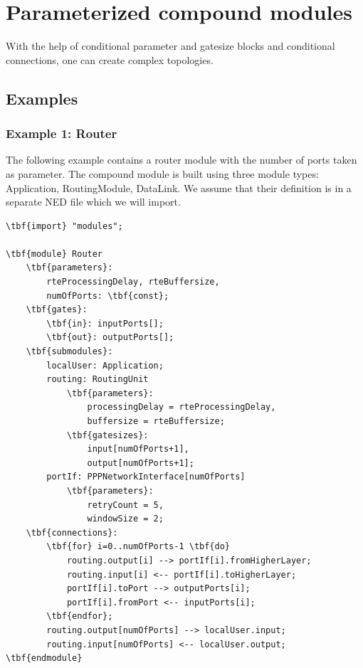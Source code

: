 \section{Parameterized compound modules}


With the help of conditional parameter and gatesize blocks and
conditional connections, one can
create complex topologies.


\subsection{Examples}

\subsubsection{Example 1: Router}

The following example contains a router module with the number of
ports taken as parameter. The compound module is built using three
module types: Application, RoutingModule, DataLink. We assume that
their definition is in a separate NED file which we will import.

\begin{Verbatim}[commandchars=\\\{\}]
\tbf{import} "modules";

\tbf{module} Router
    \tbf{parameters}:
        rteProcessingDelay, rteBuffersize,
        numOfPorts: \tbf{const};
    \tbf{gates}:
        \tbf{in}: inputPorts[];
        \tbf{out}: outputPorts[];
    \tbf{submodules}:
        localUser: Application;
        routing: RoutingUnit
            \tbf{parameters}:
                processingDelay = rteProcessingDelay,
                buffersize = rteBuffersize;
            \tbf{gatesizes}:
                input[numOfPorts+1],
                output[numOfPorts+1];
        portIf: PPPNetworkInterface[numOfPorts]
            \tbf{parameters}:
                retryCount = 5,
                windowSize = 2;
    \tbf{connections}:
        \tbf{for} i=0..numOfPorts-1 \tbf{do}
            routing.output[i] --> portIf[i].fromHigherLayer;
            routing.input[i] <-- portIf[i].toHigherLayer;
            portIf[i].toPort --> outputPorts[i];
            portIf[i].fromPort <-- inputPorts[i];
        \tbf{endfor};
        routing.output[numOfPorts] --> localUser.input;
        routing.input[numOfPorts] <-- localUser.output;
\tbf{endmodule}
\end{Verbatim}


